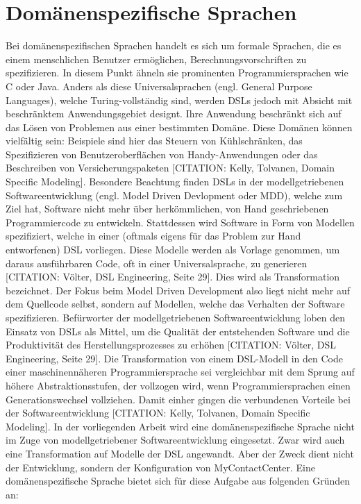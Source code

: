 \section{Domänenspezifische Sprachen}
Bei domänenspezifischen Sprachen handelt es sich um formale Sprachen, die es einem menschlichen Benutzer ermöglichen, Berechnungsvorschriften zu spezifizieren. In diesem Punkt ähneln sie prominenten Programmiersprachen wie C oder Java. Anders als diese Universalsprachen (engl. General Purpose Languages), welche Turing-vollständig sind, werden DSLs jedoch mit Absicht mit beschränktem Anwendungsgebiet designt. Ihre Anwendung beschränkt sich auf das Lösen von Problemen aus einer bestimmten Domäne. Diese Domänen können vielfältig sein: Beispiele sind hier das Steuern von Kühlschränken, das Spezifizieren von Benutzeroberflächen von Handy-Anwendungen oder das Beschreiben von Versicherungspaketen [CITATION: Kelly, Tolvanen, Domain Specific Modeling]. Besondere Beachtung finden DSLs in der modellgetriebenen Softwareentwicklung (engl. Model Driven Devlopment oder MDD), welche zum Ziel hat, Software nicht mehr über herkömmlichen, von Hand geschriebenen Programmiercode zu entwickeln. Stattdessen wird Software in Form von Modellen spezifiziert, welche in einer (oftmals eigens für das Problem zur Hand entworfenen) DSL vorliegen. Diese Modelle werden als Vorlage genommen, um daraus ausführbaren Code, oft in einer  Universalsprache, zu generieren [CITATION: Völter, DSL Engineering, Seite 29]. Dies wird als Transformation bezeichnet. Der Fokus beim Model Driven Development also liegt nicht mehr auf dem Quellcode selbst, sondern auf Modellen, welche das Verhalten der Software spezifizieren. Befürworter der modellgetriebenen Softwareentwicklung loben den Einsatz von DSLs als Mittel, um die Qualität der entstehenden Software und die Produktivität des Herstellungsprozesses zu erhöhen [CITATION: Völter, DSL Engineering, Seite 29]. Die Transformation von einem DSL-Modell in den Code einer maschinennäheren Programmiersprache sei vergleichbar mit dem Sprung auf höhere Abstraktionsstufen, der vollzogen wird, wenn Programmiersprachen einen Generationswechsel vollziehen. Damit einher gingen die verbundenen Vorteile bei der Softwareentwicklung [CITATION: Kelly, Tolvanen, Domain Specific Modeling].
\newline
In der vorliegenden Arbeit wird eine domänenspezifische Sprache nicht im Zuge von modellgetriebener Softwareentwicklung eingesetzt. Zwar wird auch eine Transformation auf Modelle der DSL angewandt. Aber der Zweck dient nicht der Entwicklung, sondern der Konfiguration von MyContactCenter. Eine domänenspezifische Sprache bietet sich für diese Aufgabe aus folgenden Gründen an: 
